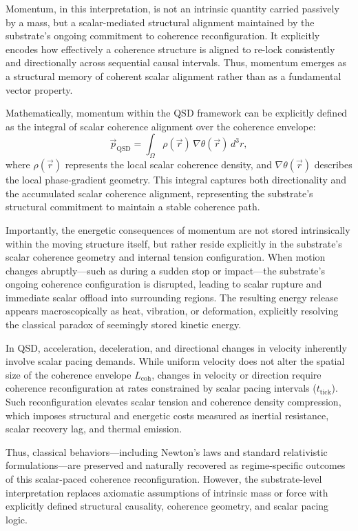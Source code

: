 \documentclass[preprints,article,submit,pdftex,moreauthors]{Definitions/mdpi}
\begin{document}
Momentum, in this interpretation, is not an intrinsic quantity carried passively by a mass, but a scalar-mediated structural alignment maintained by the substrate's ongoing commitment to coherence reconfiguration. It explicitly encodes how effectively a coherence structure is aligned to re-lock consistently and directionally across sequential causal intervals. Thus, momentum emerges as a structural memory of coherent scalar alignment rather than as a fundamental vector property.

Mathematically, momentum within the QSD framework can be explicitly defined as the integral of scalar coherence alignment over the coherence envelope:
\[
\vec{p}_{\text{QSD}} = \int_{\Omega} \rho(\vec{r}) \, \nabla \theta(\vec{r}) \, d^3r,
\]
where \(\rho(\vec{r})\) represents the local scalar coherence density, and \(\nabla \theta(\vec{r})\) describes the local phase-gradient geometry. This integral captures both directionality and the accumulated scalar coherence alignment, representing the substrate’s structural commitment to maintain a stable coherence path.

Importantly, the energetic consequences of momentum are not stored intrinsically within the moving structure itself, but rather reside explicitly in the substrate’s scalar coherence geometry and internal tension configuration. When motion changes abruptly—such as during a sudden stop or impact—the substrate’s ongoing coherence configuration is disrupted, leading to scalar rupture and immediate scalar offload into surrounding regions. The resulting energy release appears macroscopically as heat, vibration, or deformation, explicitly resolving the classical paradox of seemingly stored kinetic energy.

In QSD, acceleration, deceleration, and directional changes in velocity inherently involve scalar pacing demands. While uniform velocity does not alter the spatial size of the coherence envelope \(L_{\text{coh}}\), changes in velocity or direction require coherence reconfiguration at rates constrained by scalar pacing intervals (\(t_{\text{tick}}\)). Such reconfiguration elevates scalar tension and coherence density compression, which imposes structural and energetic costs measured as inertial resistance, scalar recovery lag, and thermal emission.

Thus, classical behaviors—including Newton’s laws and standard relativistic formulations—are preserved and naturally recovered as regime-specific outcomes of this scalar-paced coherence reconfiguration. However, the substrate-level interpretation replaces axiomatic assumptions of intrinsic mass or force with explicitly defined structural causality, coherence geometry, and scalar pacing logic.
\end{document}
